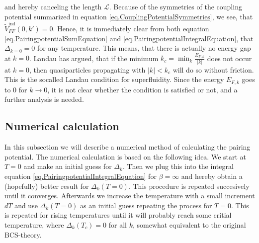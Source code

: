 and hereby canceling the length $\mathcal{L}$. Because of the symmetries of the coupling potential summarized in equation \eqref{eq.CouplingPotentialSymmetries}, we see, that $\tilde{V}^\text{ind}_{FF}(0,k') = 0$. Hence, it is immediately clear from both equation \eqref{eq.PairingpotentialSumEquation} and \eqref{eq.PairingpotentialIntegralEquation}, that $\Delta_{k=0} = 0$ for any temperature. This means, that there is actually no energy gap at $k=0$. Landau has argued, that if the minimum $k_c = \min_k \frac{E_{F,k}}{|k|}$ does not occur at $k=0$, then quasiparticles propagating with $|k|< k_c$ will do so without friction. This is the socalled Landau condition for superfluidity\cite{LandauStatPhys2,PlischkeStatPhys}. Since the energy $E_{F,k}$ goes to 0 for $k\to 0$, it is not clear whether the condition is satisfied or not, and a further analysis is needed. 

\subsection{Numerical calculation}
In this subsection we will describe a numerical method of calculating the pairing potential. The numerical calculation is based on the following idea. We start at $T=0$ and make an initial guess for $\Delta_k$. Then we plug this into the integral equation \eqref{eq.PairingpotentialIntegralEquation} for $\beta = \infty$ and hereby obtain a (hopefully) better result for $\Delta_k(T=0)$. This procedure is repeated succesively until it converges. Afterwards we increase the temperature with a small increment $dT$ and use $\Delta_k(T=0)$ as an initial guess repeating the process for $T=0$. This is repeated for rising temperatures until it will probably reach some critial temperature, where $\Delta_k(T_c)=0$ for all $k$, somewhat equivalent to the original BCS-theory\cite{Tinkham,LandauStatPhys2,PlischkeStatPhys}.    

